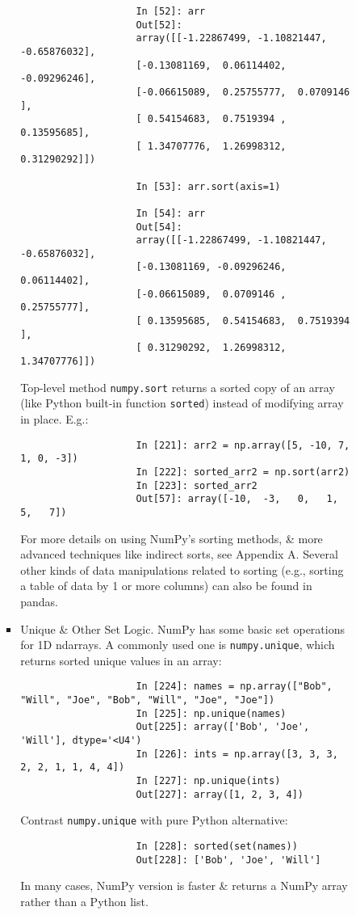 \documentclass{article}
\begin{document}
\begin{enumerate}
\begin{itemize}
\begin{itemize}
\begin{itemize}
\begin{verbatim}
					In [52]: arr
					Out[52]: 
					array([[-1.22867499, -1.10821447, -0.65876032],
					[-0.13081169,  0.06114402, -0.09296246],
					[-0.06615089,  0.25755777,  0.0709146 ],
					[ 0.54154683,  0.7519394 ,  0.13595685],
					[ 1.34707776,  1.26998312,  0.31290292]])
					
					In [53]: arr.sort(axis=1)
					
					In [54]: arr
					Out[54]: 
					array([[-1.22867499, -1.10821447, -0.65876032],
					[-0.13081169, -0.09296246,  0.06114402],
					[-0.06615089,  0.0709146 ,  0.25755777],
					[ 0.13595685,  0.54154683,  0.7519394 ],
					[ 0.31290292,  1.26998312,  1.34707776]])
				\end{verbatim}
				Top-level method {\tt numpy.sort} returns a sorted copy of an array (like Python built-in function {\tt sorted}) instead of modifying array in place. E.g.:
				\begin{verbatim}
					In [221]: arr2 = np.array([5, -10, 7, 1, 0, -3])
					In [222]: sorted_arr2 = np.sort(arr2)
					In [223]: sorted_arr2
					Out[57]: array([-10,  -3,   0,   1,   5,   7])
				\end{verbatim}
				For more details on using NumPy's sorting methods, \& more advanced techniques like indirect sorts, see Appendix A. Several other kinds of data manipulations related to sorting (e.g., sorting a table of data by 1 or more columns) can also be found in pandas.
				\item {\sf Unique \& Other Set Logic.} NumPy has some basic set operations for 1D ndarrays. A commonly used one is {\tt numpy.unique}, which returns sorted unique values in an array:
				\begin{verbatim}
					In [224]: names = np.array(["Bob", "Will", "Joe", "Bob", "Will", "Joe", "Joe"])
					In [225]: np.unique(names)
					Out[225]: array(['Bob', 'Joe', 'Will'], dtype='<U4')
					In [226]: ints = np.array([3, 3, 3, 2, 2, 1, 1, 4, 4])
					In [227]: np.unique(ints)
					Out[227]: array([1, 2, 3, 4])
				\end{verbatim}
				Contrast {\tt numpy.unique} with pure Python alternative:
				\begin{verbatim}
					In [228]: sorted(set(names))
					Out[228]: ['Bob', 'Joe', 'Will']
				\end{verbatim}
				In many cases, NumPy version is faster \& returns a NumPy array rather than a Python list.
				

\end{itemize}
\end{itemize}
\end{itemize}
\end{enumerate}
\end{document}
